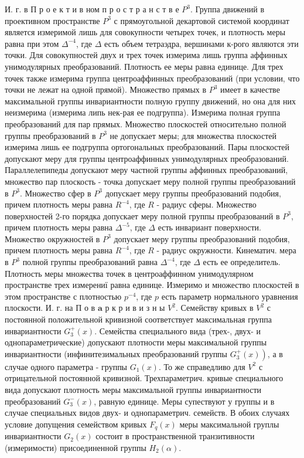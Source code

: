 \documentclass[10pt]{article}
\begin{document}
И. г. в П р о е к т и в ном п р о с т р а н с т в е $P^{3}$. Группа движений в проективном пространстве $P^{3}$ с прямоугольной декартовой системой координат является измеримой лишь для совокупности четырех точек, и плотность меры равна при этом $\Delta^{-4}$, где $\Delta$ есть объем тетраэдра, вершинами к-рого являются эти точки. Для совокупностей двух и трех точек измерима лишь группа аффинных унимодулярных преобразований. Плотность ее меры равна единице. Для трех точек также измерима группа центроаффинных преобразований (при условии, что точки не лежат на одной прямой). Множество прямых в $P^{3}$ имеет в качестве максимальной группы инвариантности полную группу движений, но она для них неизмерима (измерима липь нек-рая ее подгруппа). Измерима полная группа преобразований для пар прямых. Множество плоскостей относительно полной группы преобразований в $P^{3}$ не допускает меры; для множества плоскостей измерима лишь ее подгруппа ортогональных преобразований. Пары плоскостей допускают меру для группы центроаффинных унимодулярных преобразований. Параллелепипеды допускают меру частной группы аффинных преобразований, множество пар плоскость - точка допускает меру полной группы преобразований в $P^{3}$. Множество сфер в $P^{3}$ допускает меру группы преобразований подобия, причем плотность меры равна $R^{-4}$, где $R$ - радиус сферы. Множество поверхностей 2-го порядка допускает меру полной группы преобразований в $P^{3}$, причем плотность меры равна $\Delta^{-5}$, где $\Delta$ есть инвариант поверхности. Множество окружностей в $P^{3}$ допускает меру группы преобразований подобия, причем плотность меры равна $R^{-4}$, где $R$ - радиус окружности. Кинематич. мера в $P^{3}$ полной группы преобразований равна $\Delta^{-4}$, где $\Delta$ есть ее определитель. Плотность меры множества точек в центроаффинном унимодулярном пространстве трех измерениї равна единице. Измеримо и множество плоскостей в этом пространстве с плотностью $p^{-4}$, где $p$ есть параметр нормального уравнения плоскости. И. г. на П о в $\mathbf{a}$ р к р и в и з н ы $V^{2}$. Семейству кривых в $V^{2}$ с постоянной положительной кривизной соответствует максимальная группа инвариантности $G_{3}^{+}(x)$. Семейства специального вида (трех-, двух- и однопараметрические) допускают плотности меры максимальной группы инвариантности (инфинитезимальных преобразований группы $\left.G_{3}^{+}(x)\right)$, а в случае одного параметра - группы $G_{1}(x)$. То же справедливо для $V^{2}$ с отрицательной постоянной кривизной. Трехпараметрич. кривые специального вида допускают плотность меры максимальной группы инвариантности преобразований $G_{3}^{-}(x)$, равную единице. Меры супествуют у группы и в случае специальных видов двух- и однопараметрич. семейств. В обоих случаях условие допущения семейством кривых $F_{q}(x)$ меры максимальной груплы инвариантности $G_{2}(x)$ состоит в пространственной транзитивности (измеримости) присоединенной группы $H_{2}(\alpha)$.
\end{document}
